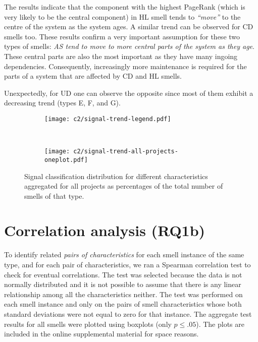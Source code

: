 The results indicate that the component with the highest PageRank (which is very likely to be the central component) in HL smell tends to \emph{``move''} to the centre of the system as the system ages. A similar trend can be observed for CD smells too.
These results confirm a very important assumption for these two types of smells: \emph{AS tend to move to more central parts of the system as they age}. These central parts are also the most important as they have many ingoing dependencies. Consequently, increasingly more maintenance is required for the parts of a system that are affected by CD and HL smells. 

Unexpectedly, for UD one can observe the opposite since most of them exhibit a decreasing trend (types E, F, and G).

\vspace{1mm}

\begin{figure}[t]
    \centering
    \begin{subfigure}[]{.8\textwidth}
        \centering
        \texttt{[image: c2/signal-trend-legend.pdf]}
    \end{subfigure}
	\hfill \\
    \begin{subfigure}[]{.8\textwidth}
        \centering
        \texttt{[image: c2/signal-trend-all-projects-oneplot.pdf]}
    \end{subfigure}
    \caption{Signal classification distribution for different characteristics aggregated for all projects as percentages of the total number of smells of that type.} 
    \label{c2:fig:signal-all}
\end{figure}

\section{Correlation analysis (RQ1b)}\label{c2:sec:rq1b-results}
To identify related \textit{pairs of characteristics} for each smell instance of the same type, and for each pair of characteristics, we ran a Spearman correlation test to check for eventual correlations. 
The test was selected because the data is not normally distributed and it is not possible to assume that there is any linear relationship among all the characteristics neither.
The test was performed on each smell instance and only on the pairs of smell characteristics whose both standard deviations were not equal to zero for that instance.
The aggregate test results for all smells were plotted using boxplots (only $p \leq .05$).
The plots are included in the online supplemental material for space reasons.


